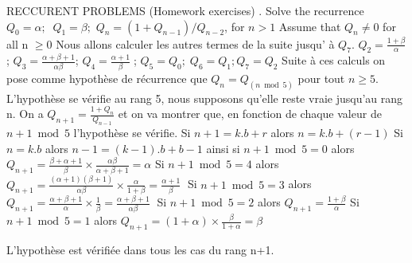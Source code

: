 \documentclass{amsart}
\begin{document}
\newline\newline
RECCURENT PROBLEMS (Homework exercises)
\newline{}. Solve the recurrence 
$Q_{0} = \alpha; \;\; Q_{1}= \beta;$\newline 
$Q_{n} = (1 + Q_{n-1}) / Q_{n-2}$, for $n > 1$
\newline Assume that $Q_{n}  \neq 0$ for all n $\geq 0$\newline\newline
Nous allons calculer les autres termes de la suite jusqu' \`{a} $Q_{7}$.\newline
$Q_{2} = \frac{1+\beta}{\alpha}$;\; $Q_{3} = \frac{\alpha+\beta+1}{\alpha\beta}$;\; $Q_{4}=\frac{\alpha+1}{\beta}\;$; $Q_{5}= Q_{0};\; Q_{6} = Q_{1}; Q_{7} = Q_{2}$ 
\newline\newline Suite à ces calculs on pose comme hypothèse de récurrence que $Q_{n} = Q_{(n\bmod5)}$ pour tout $n \geq 5$. L'hypothèse se vérifie au rang 5, nous supposons qu'elle reste vraie jusqu'au rang n. On a $Q_{n+1} = \frac{1 + Q_{n}}{Q_{n-1}}$ et on va montrer que, en fonction de chaque valeur de $n+1\bmod5$ l'hypothèse se vérifie. \newline\newline
Si $n+1 = k.b + r$ alors $n = k.b + (r-1)$ \newline
Si $n = k.b$ alors $n-1 = (k-1).b + b - 1$\newline
ainsi si $n+1 \bmod 5 = 0$ alors $Q_{n+1} = \frac{\beta+\alpha+1}{\beta}\times\frac{\alpha\beta}{\alpha+\beta+1} = \alpha$\newline
Si $n+1 \bmod 5 = 4$ alors $Q_{n+1} = \frac{(\alpha+1)(\beta+1)}{\alpha\beta}\times\frac{\alpha}{1 + \beta} = \frac{\alpha+1}{\beta}\;$\newline
Si $n+1 \bmod 5 = 3$ alors  $Q_{n+1} = \frac{\alpha+\beta+1}{\alpha}\times\frac{1}{\beta} = \frac{\alpha+\beta+1}{\alpha\beta}\;$\newline
Si $n+1 \bmod 5 = 2$ alors  $Q_{n+1} = \frac{1+\beta}{\alpha}$\newline
Si $n+1 \bmod 5 = 1$ alors  $Q_{n+1} = (1 + \alpha)\times\frac{\beta}{1+\alpha} = \beta$\newline\newline

L'hypothèse est vérifiée dans tous les cas du rang n+1.
\end{document}
